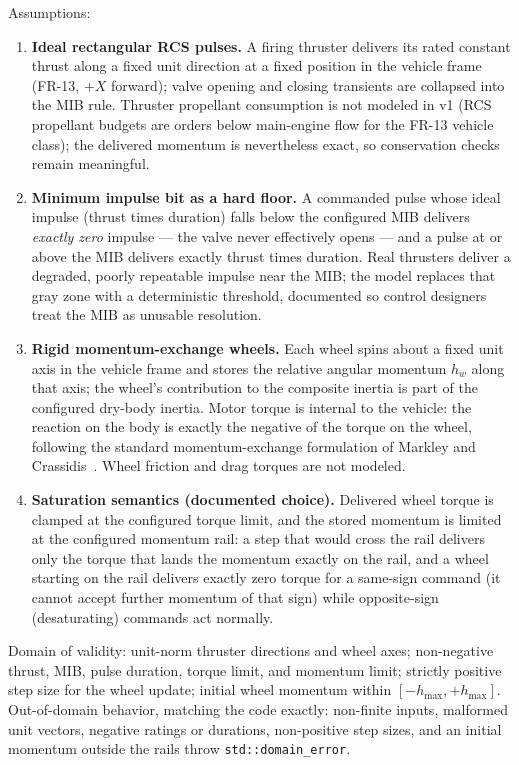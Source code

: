 Assumptions:
\begin{enumerate}
  \item \textbf{Ideal rectangular RCS pulses.} A firing thruster
    delivers its rated constant thrust along a fixed unit direction at
    a fixed position in the vehicle frame (FR-13, $+X$ forward); valve
    opening and closing transients are collapsed into the MIB rule.
    Thruster propellant consumption is not modeled in v1 (RCS
    propellant budgets are orders below main-engine flow for the FR-13
    vehicle class); the delivered momentum is nevertheless exact, so
    conservation checks remain meaningful.
  \item \textbf{Minimum impulse bit as a hard floor.} A commanded pulse
    whose ideal impulse (thrust times duration) falls below the
    configured MIB delivers \emph{exactly zero} impulse --- the valve
    never effectively opens --- and a pulse at or above the MIB
    delivers exactly thrust times duration. Real thrusters deliver a
    degraded, poorly repeatable impulse near the MIB; the model
    replaces that gray zone with a deterministic threshold, documented
    so control designers treat the MIB as unusable resolution.
  \item \textbf{Rigid momentum-exchange wheels.} Each wheel spins about
    a fixed unit axis in the vehicle frame and stores the relative
    angular momentum $h_w$ along that axis; the wheel's contribution to
    the composite inertia is part of the configured dry-body inertia.
    Motor torque is internal to the vehicle: the reaction on the body
    is exactly the negative of the torque on the wheel, following the
    standard momentum-exchange formulation of Markley and
    Crassidis~\cite{markley2014}. Wheel friction and drag torques are
    not modeled.
  \item \textbf{Saturation semantics (documented choice).} Delivered
    wheel torque is clamped at the configured torque limit, and the
    stored momentum is limited at the configured momentum rail: a step
    that would cross the rail delivers only the torque that lands the
    momentum exactly on the rail, and a wheel starting on the rail
    delivers exactly zero torque for a same-sign command (it cannot
    accept further momentum of that sign) while opposite-sign
    (desaturating) commands act normally.
\end{enumerate}

Domain of validity: unit-norm thruster directions and wheel axes;
non-negative thrust, MIB, pulse duration, torque limit, and momentum
limit; strictly positive step size for the wheel update; initial wheel
momentum within $[-h_{\max}, +h_{\max}]$. Out-of-domain behavior,
matching the code exactly: non-finite inputs, malformed unit vectors,
negative ratings or durations, non-positive step sizes, and an initial
momentum outside the rails throw \texttt{std::domain\_error}.

